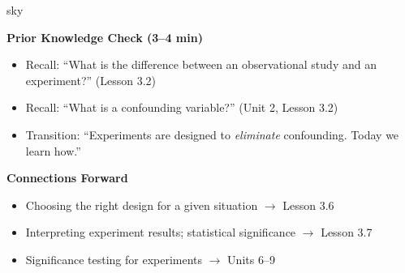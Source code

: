 \documentclass[10pt]{article}
\begin{document}
\begin{skillbox}{sky}
\begin{minipage}[t]{0.48\linewidth}
    \textbf{Prior Knowledge Check (3--4 min)}
    \begin{itemize}
        \item Recall: ``What is the difference between an observational study and an
              experiment?'' (Lesson 3.2)
        \item Recall: ``What is a confounding variable?'' (Unit 2, Lesson 3.2)
        \item Transition: ``Experiments are designed to \emph{eliminate} confounding.
              Today we learn how.''
    \end{itemize}
\end{minipage}
\hfill
\begin{minipage}[t]{0.48\linewidth}
    \textbf{Connections Forward}
    \begin{itemize}
        \item Choosing the right design for a given situation $\to$ Lesson 3.6
        \item Interpreting experiment results; statistical significance $\to$ Lesson 3.7
        \item Significance testing for experiments $\to$ Units 6--9
    \end{itemize}
\end{minipage}
\end{skillbox}
\end{document}
